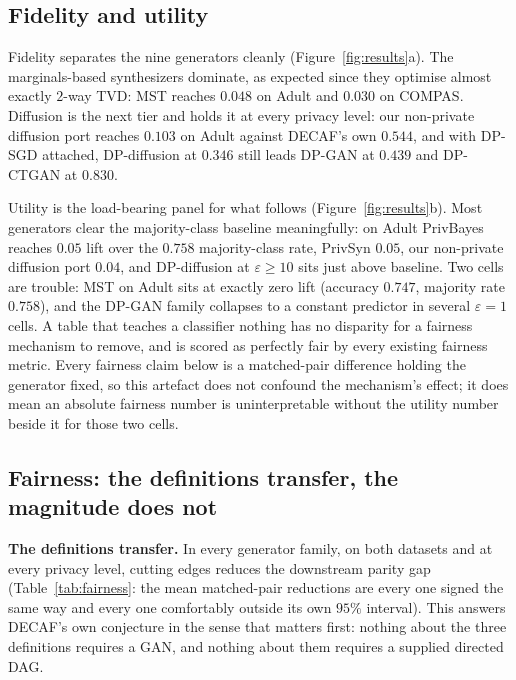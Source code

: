 \documentclass{article}
\begin{document}
\subsection{Fidelity and utility}

Fidelity separates the nine generators cleanly (Figure~\ref{fig:results}a).
The marginals-based synthesizers dominate, as expected since they optimise
almost exactly $2$-way TVD: MST reaches $0.048$ on Adult and $0.030$ on
COMPAS. Diffusion is the next tier and holds it at every privacy level: our
non-private diffusion port reaches $0.103$ on Adult against DECAF's own
$0.544$, and with DP-SGD attached, DP-diffusion at $0.346$ still leads
DP-GAN at $0.439$ and DP-CTGAN at $0.830$.

Utility is the load-bearing panel for what follows (Figure~\ref{fig:results}b).
Most generators clear the majority-class baseline meaningfully: on Adult
PrivBayes reaches $0.05$ lift over the $0.758$ majority-class rate, PrivSyn
$0.05$, our non-private diffusion port $0.04$, and DP-diffusion at
$\varepsilon\geq10$ sits just above baseline. Two cells are trouble: MST on
Adult sits at exactly zero lift (accuracy $0.747$, majority rate $0.758$),
and the DP-GAN family collapses to a constant predictor in several
$\varepsilon{=}1$ cells. A table that teaches a classifier nothing has no
disparity for a fairness mechanism to remove, and is scored as perfectly
fair by every existing fairness metric. Every fairness claim below is a
matched-pair difference holding the generator fixed, so this artefact does not
confound the mechanism's effect; it does mean an absolute fairness number is
uninterpretable without the utility number beside it for those two cells.

\subsection{Fairness: the definitions transfer, the magnitude does not}



\textbf{The definitions transfer.} In every generator family, on both
datasets and at every privacy level, cutting edges reduces the downstream
parity gap (Table~\ref{tab:fairness}: the mean matched-pair reductions are
every one signed the same way and every one comfortably outside its own
$95\%$ interval). This answers DECAF's own conjecture in the sense that
matters first: nothing about the three definitions requires a GAN, and
nothing about them requires a supplied directed DAG.
\end{document}
